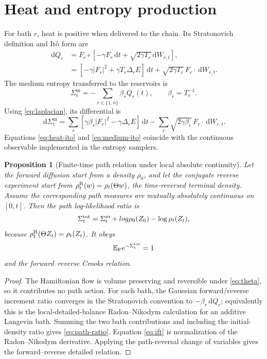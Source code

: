 \documentclass[11pt]{article}
\newtheorem{proposition}[theorem]{Proposition}
\theoremstyle{remark}
\newcommand{\E}{\mathbb E}
\newcommand{\dd}{\,\mathrm d}
\newcommand{\SigmaM}{\Sigma^{\mathrm m}}
\begin{document}
\section{Heat and entropy production}

For bath $r$, heat is positive when delivered to the chain.  Its
Stratonovich definition and It\^o form are
\begin{align}
 \dd Q_r
 &=F_r\circ\left[-\gamma F_r\dd t
       +\sqrt{2\gamma T_r}\dd W_{r,t}\right],\label{eq:heat-strat}\\
 &=\left[-\gamma|F_r|^2+\gamma T_r\Delta_rE\right]\dd t
   +\sqrt{2\gamma T_r}\,F_r\cdot\dd W_{r,t}.\label{eq:heat-ito}
\end{align}
The medium entropy transferred to the reservoirs is
\begin{equation}\label{eq:medium}
 \SigmaM_t=-\sum_{r\in\{1,n\}}\beta_rQ_r(t),
 \qquad \beta_r=T_r^{-1}.
\end{equation}
Using \eqref{eq:laplacian}, its differential is
\begin{equation}\label{eq:medium-ito}
 \dd\SigmaM_t=\sum_r\left[
 \gamma\beta_r|F_r|^2-\gamma\Delta_rE\right]\dd t
 -\sum_r\sqrt{2\gamma\beta_r}\,F_r\cdot\dd W_{r,t}.
\end{equation}
Equations \eqref{eq:heat-ito} and \eqref{eq:medium-ito} coincide with the
continuous observable implemented in the entropy samplers.

\begin{proposition}[Finite-time path relation under local absolute
continuity]\label{prop:path}
Let the forward diffusion start from a density $\rho_0$, and let the conjugate
reverse experiment start from
$\rho_t^{\rm R}(w)=\rho_t(\Theta w)$, the time-reversed terminal density.
Assume the
corresponding path measures are mutually absolutely continuous on $[0,t]$.
Then the path log-likelihood ratio is
\begin{equation}\label{eq:path-ratio}
 \Sigma^{\rm tot}_t=\SigmaM_t+log\rho_0(Z_0)-\log\rho_t(Z_t),
\end{equation}
because $\rho_t^{\rm R}(\Theta Z_t)=\rho_t(Z_t)$.  It
obeys
\begin{equation}\label{eq:ift}
 \E_{\rm F}e^{-\Sigma^{\rm tot}_t}=1
\end{equation}
and the forward--reverse Crooks relation.
\end{proposition}

\begin{proof}
The Hamiltonian flow is volume preserving and reversible under \eqref{eq:theta},
so it contributes no path action.  For each bath, the Gaussian
forward/reverse increment ratio converges in the Stratonovich convention to
$-\beta_r\dd Q_r$; equivalently this is the local-detailed-balance
Radon--Nikodym calculation for an additive Langevin bath.  Summing the two
bath contributions and including the
initial-density ratio gives \eqref{eq:path-ratio}.  Equation \eqref{eq:ift} is
normalization of the Radon--Nikodym derivative.  Applying the path-reversal
change of variables gives the forward--reverse detailed relation.
\end{proof}
\end{document}
